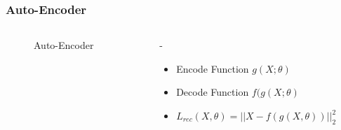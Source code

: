 \documentclass{beamer}
\newlength{\mylen}
\begin{document}
\begin{frame}
  \frametitle{Auto-Encoder}
  \begin{columns}[T] %
    \setlength{\mylen}{0.4\textwidth}
    \begin{column}{\mylen}
      \begin{figure}[!h]
        \centering
        \caption{Auto-Encoder}
        \label{fig:AE}
      \end{figure}
    \end{column}%
    \hfill%
    \begin{column}{\dimexpr\textwidth-\mylen}
      \pause
      \begin{itemize}
        \setlength\itemsep{2em}
      \item Encode Function $g(X; \theta)$ \pause
      \item Decode Function $f(g(X; \theta)$ \pause
      \item $L_{rec}(X, \theta) = || X - f(g(X, \theta)) ||_2^2$
      \end{itemize}
    \end{column}%
  \end{columns}
\end{frame}
\end{document}
